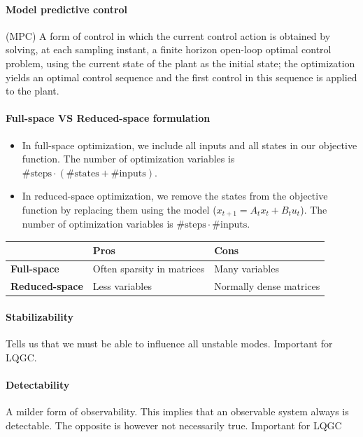 \paragraph{Model predictive control} (MPC) A form of control in which the current control action is obtained by solving, at each sampling instant, a finite horizon open-loop optimal control problem, using the current state of the plant as the initial state; the optimization yields an optimal control sequence and the first control in this sequence is applied to the plant.

\paragraph{Full-space VS Reduced-space formulation}  
 \begin{itemize}[nolistsep,noitemsep]
     \item In full-space optimization, we include all inputs and all states in our objective function. The number of optimization variables is $\#\mathrm{steps} \cdot (\#\mathrm{states} + \#\mathrm{inputs})$.
     \item In reduced-space optimization, we remove the states from the objective function by replacing them using the model ($x_{t+1} = A_t x_t + B_t u_t$). The number of optimization variables is $\#\mathrm{steps} \cdot \#\mathrm{inputs}$.
 \end{itemize}

\hskip-0.5cm
\begin{tabularx}{\linewidth}{X X X}
	& \textbf{Pros} & \textbf{Cons}\\
	\hline
	\textbf{Full-space} & Often sparsity in matrices & Many variables\\
	\textbf{Reduced-space} & Less variables & Normally dense matrices
\end{tabularx}

\paragraph{Stabilizability} 
Tells us that we must be able to influence all unstable modes. Important for LQGC.

\paragraph{Detectability}
A milder form of observability. This implies that an
observable system always is detectable. The opposite is however not
necessarily true. Important for LQGC
